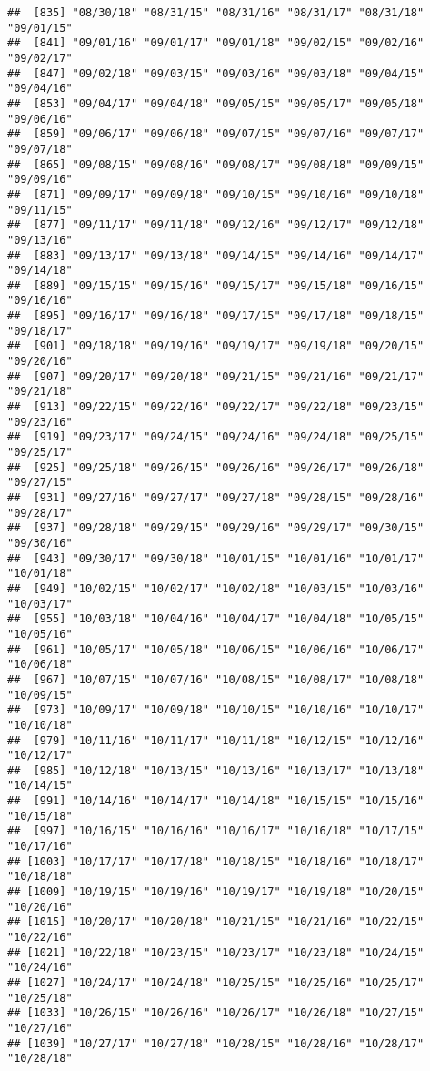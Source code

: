 \documentclass[]{article}
\begin{document}
\begin{verbatim}
##  [835] "08/30/18" "08/31/15" "08/31/16" "08/31/17" "08/31/18" "09/01/15"
##  [841] "09/01/16" "09/01/17" "09/01/18" "09/02/15" "09/02/16" "09/02/17"
##  [847] "09/02/18" "09/03/15" "09/03/16" "09/03/18" "09/04/15" "09/04/16"
##  [853] "09/04/17" "09/04/18" "09/05/15" "09/05/17" "09/05/18" "09/06/16"
##  [859] "09/06/17" "09/06/18" "09/07/15" "09/07/16" "09/07/17" "09/07/18"
##  [865] "09/08/15" "09/08/16" "09/08/17" "09/08/18" "09/09/15" "09/09/16"
##  [871] "09/09/17" "09/09/18" "09/10/15" "09/10/16" "09/10/18" "09/11/15"
##  [877] "09/11/17" "09/11/18" "09/12/16" "09/12/17" "09/12/18" "09/13/16"
##  [883] "09/13/17" "09/13/18" "09/14/15" "09/14/16" "09/14/17" "09/14/18"
##  [889] "09/15/15" "09/15/16" "09/15/17" "09/15/18" "09/16/15" "09/16/16"
##  [895] "09/16/17" "09/16/18" "09/17/15" "09/17/18" "09/18/15" "09/18/17"
##  [901] "09/18/18" "09/19/16" "09/19/17" "09/19/18" "09/20/15" "09/20/16"
##  [907] "09/20/17" "09/20/18" "09/21/15" "09/21/16" "09/21/17" "09/21/18"
##  [913] "09/22/15" "09/22/16" "09/22/17" "09/22/18" "09/23/15" "09/23/16"
##  [919] "09/23/17" "09/24/15" "09/24/16" "09/24/18" "09/25/15" "09/25/17"
##  [925] "09/25/18" "09/26/15" "09/26/16" "09/26/17" "09/26/18" "09/27/15"
##  [931] "09/27/16" "09/27/17" "09/27/18" "09/28/15" "09/28/16" "09/28/17"
##  [937] "09/28/18" "09/29/15" "09/29/16" "09/29/17" "09/30/15" "09/30/16"
##  [943] "09/30/17" "09/30/18" "10/01/15" "10/01/16" "10/01/17" "10/01/18"
##  [949] "10/02/15" "10/02/17" "10/02/18" "10/03/15" "10/03/16" "10/03/17"
##  [955] "10/03/18" "10/04/16" "10/04/17" "10/04/18" "10/05/15" "10/05/16"
##  [961] "10/05/17" "10/05/18" "10/06/15" "10/06/16" "10/06/17" "10/06/18"
##  [967] "10/07/15" "10/07/16" "10/08/15" "10/08/17" "10/08/18" "10/09/15"
##  [973] "10/09/17" "10/09/18" "10/10/15" "10/10/16" "10/10/17" "10/10/18"
##  [979] "10/11/16" "10/11/17" "10/11/18" "10/12/15" "10/12/16" "10/12/17"
##  [985] "10/12/18" "10/13/15" "10/13/16" "10/13/17" "10/13/18" "10/14/15"
##  [991] "10/14/16" "10/14/17" "10/14/18" "10/15/15" "10/15/16" "10/15/18"
##  [997] "10/16/15" "10/16/16" "10/16/17" "10/16/18" "10/17/15" "10/17/16"
## [1003] "10/17/17" "10/17/18" "10/18/15" "10/18/16" "10/18/17" "10/18/18"
## [1009] "10/19/15" "10/19/16" "10/19/17" "10/19/18" "10/20/15" "10/20/16"
## [1015] "10/20/17" "10/20/18" "10/21/15" "10/21/16" "10/22/15" "10/22/16"
## [1021] "10/22/18" "10/23/15" "10/23/17" "10/23/18" "10/24/15" "10/24/16"
## [1027] "10/24/17" "10/24/18" "10/25/15" "10/25/16" "10/25/17" "10/25/18"
## [1033] "10/26/15" "10/26/16" "10/26/17" "10/26/18" "10/27/15" "10/27/16"
## [1039] "10/27/17" "10/27/18" "10/28/15" "10/28/16" "10/28/17" "10/28/18"

\end{verbatim}
\end{document}
